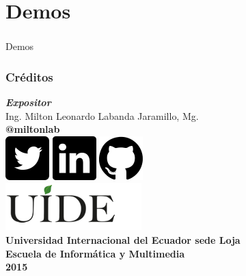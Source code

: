 \documentclass[sans serif,9pt,xcolor=dvipsnames]{beamer}%
\begin{document}
\section{Demos}
\begin{frame}
\frametitle {}
\centering \Huge Demos
\end{frame}



\begin{frame}
\frametitle {Créditos}
\begin{center}
\textbf{\textit{Expositor}}\\
Ing. Milton Leonardo Labanda Jaramillo, Mg.\\
\vspace{0.25 cm}
\textbf{@miltonlab}\\
\vspace{0.15 cm}
\includegraphics[scale=0.25]{imagenes/twitter47.png} \hspace{0.5 cm}
\includegraphics[scale=0.25]{imagenes/linkedin12.png} \hspace{0.5 cm} \includegraphics[scale=0.25]{imagenes/github17.png}\\
\vspace{1 cm}
\includegraphics{imagenes/uide.png} \\
\textbf{Universidad Internacional del Ecuador sede Loja\\
Escuela de Informática y Multimedia\\
2015
}
	\end{center}
\end{frame}
\end{document}

